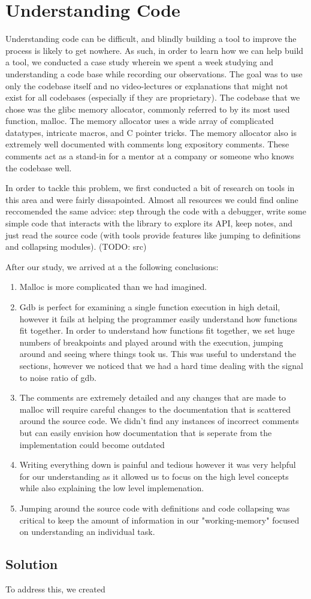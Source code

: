 \chapter{Understanding Code}
Understanding code can be difficult, and blindly building a tool to improve the process is likely to get nowhere. As such, in order to learn how we can help build a tool, we conducted a case study wherein we spent a week studying and understanding a code base while recording our observations. The goal was to use only the codebase itself and no video-lectures or explanations that might not exist for all codebases (especially if they are proprietary). The codebase that we chose was the glibc memory allocator, commonly referred to by its most used function, malloc. The memory allocator uses a wide array of complicated datatypes, intricate macros, and C pointer tricks. The memory allocator also is extremely well documented with comments long expository comments. These comments act as a stand-in for a mentor at a company or someone who knows the codebase well.

In order to tackle this problem, we first conducted a bit of research on tools in this area and were fairly dissapointed. Almost all resources we could find online reccomended the same advice: step through the code with a debugger, write some simple code that interacts with the library to explore its API, keep notes, and just read the source code (with tools provide features like jumping to definitions and collapsing modules). (TODO: src)

\noindent After our study, we arrived at a the following conclusions:
\begin{enumerate}
    \item Malloc is more complicated than we had imagined.
    \item Gdb is perfect for examining a single function execution in high detail, however it fails at helping the programmer easily understand how functions fit together. In order to understand how functions fit together, we set huge numbers of breakpoints and played around with the execution, jumping around and seeing where things took us. This was useful to understand the sections, however we noticed that we had a hard time dealing with the signal to noise ratio of gdb. 
    \item The comments are extremely detailed and any changes that are made to malloc will require careful changes to the documentation that is scattered around the source code. We didn't find any instances of incorrect comments but can easily envision how documentation that is seperate from the implementation could become outdated
    \item Writing everything down is painful and tedious however it was very helpful for our understanding as it allowed us to focus on the high level concepts while also explaining the low level implemenation.
    \item Jumping around the source code with definitions and code collapsing was critical to keep the amount of information in our "working-memory" focused on understanding an individual task.
\end{enumerate}

\section{Solution}
To address this, we created 
